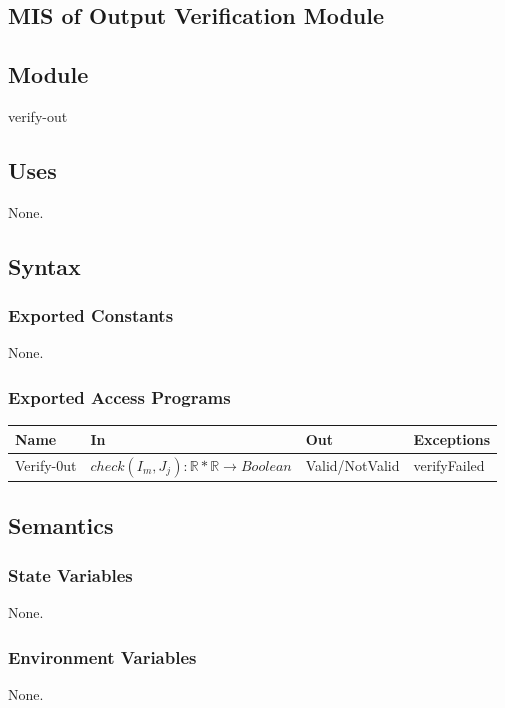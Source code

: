 \documentclass[12pt, titlepage]{article}
\begin{document}
\subsection{MIS of Output Verification Module \label{mSpec} }

\subsection{Module}

verify-out

\subsection{Uses}
None.

\subsection{Syntax}

\subsubsection{Exported Constants}
None.
\subsubsection{Exported Access Programs}
\begin{center}
\begin{tabular}{p{2cm} p{4cm} p{4cm} p{2cm}}
\hline
\textbf{Name} & \textbf{In} & \textbf{Out} & \textbf{Exceptions} \\
\hline

Verify-0ut & $check(I_m,J_j):\mathbb{R}*\mathbb{R} \rightarrow {Boolean}$  & Valid/NotValid & verifyFailed \\
\hline
\end{tabular}
\end{center}
\subsection{Semantics}
\subsubsection{State Variables}
None.

\subsubsection{Environment Variables}
None.
\end{document}
